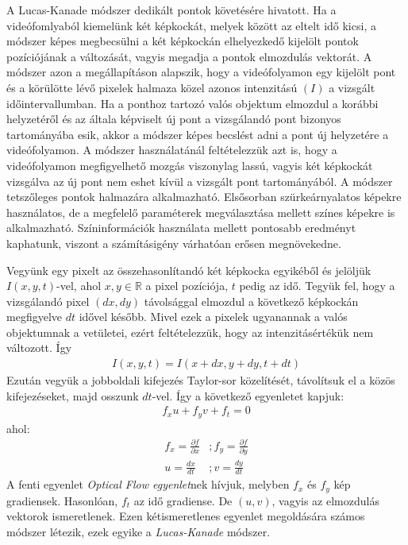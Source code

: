 A Lucas-Kanade módszer dedikált pontok követésére hivatott. Ha a videófomlyaból kiemelünk két képkockát, melyek között az eltelt idő kicsi, a módszer képes megbecsülni a két képkockán elhelyezkedő kijelölt pontok pozíciójának a változását, vagyis megadja a pontok elmozdulás vektorát. A módszer azon a megállapításon alapszik, hogy a videófolyamon egy kijelölt pont és a körülötte lévő pixelek halmaza közel azonos intenzitású $(I)$ a vizsgált időintervallumban. Ha a ponthoz tartozó valós objektum elmozdul a korábbi helyzetéről és az általa képviselt új pont a vizsgálandó pont bizonyos tartományába esik, akkor a módszer képes becslést adni a pont új helyzetére a videófolyamon. A módszer használatánál feltételezzük azt is, hogy a videófolyamon megfigyelhető mozgás viszonylag lassú, vagyis két képkockát vizsgálva az új pont nem eshet kívül a vizsgált pont tartományából. A módszer tetszőleges pontok halmazára alkalmazható. Elsősorban szürkeárnyalatos képekre használatos, de a megfelelő paraméterek megválasztása mellett színes képekre is alkalmazható. Színinformációk használata mellett pontosabb eredményt kaphatunk, viszont a számításigény várhatóan erősen megnövekedne.

Vegyünk egy pixelt az összehasonlítandó két képkocka egyikéből és jelöljük $I(x,y,t)$-vel, ahol $x,y \in \mathbb{R}$ a pixel pozíciója, $t$ pedig az idő. Tegyük fel, hogy a vizsgálandó pixel $(dx, dy)$ távolsággal elmozdul a következő képkockán megfigyelve $dt$ idővel később. Mivel ezek a pixelek ugyanannak a valós objektumnak a vetületei, ezért feltételezzük, hogy az intenzitásértékük nem változott. Így
\begin{align*}
I(x,y,t) = I(x+dx,y+dy,t+dt)
\end{align*}
Ezután vegyük a jobboldali kifejezés Taylor-sor közelítését, távolítsuk el a közös kifejezéseket, majd osszunk $dt$-vel. Így a következő egyenletet kapjuk:
\begin{align*}
f_xu+f_yv+f_t=0
\end{align*}
ahol:
\begin{align*}
f_x = \frac{\partial f}{\partial x} &; f_y = \frac{\partial f}{\partial y}\\
u = \frac{dx}{dt} &; v = \frac{dy}{dt}
\end{align*}
A fenti egyenlet \textit{Optical Flow egyenlet}nek hívjuk, melyben $f_x$ és $f_y$ kép gradiensek. Hasonlóan, $f_t$ az idő gradiense. De $(u,v)$, vagyis az elmozdulás vektorok ismeretlenek. Ezen kétismeretlenes egyenlet megoldására számos módszer létezik, ezek egyike a \textit{Lucas-Kanade} módszer.

